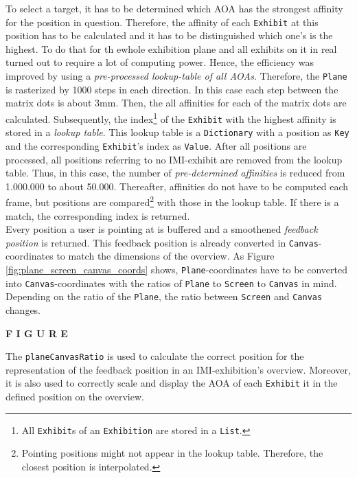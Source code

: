 To select a target, it has to be determined which \ac{AOA} has the strongest affinity for the position in question. Therefore, the affinity of each \texttt{Exhibit} at this position has to be calculated and it has to be distinguished which one's is the highest. To do that for th ewhole exhibition plane and all exhibits on it in real turned out to require a lot of computing power. Hence, the efficiency was improved by using a \textit{pre-processed lookup-table of all \ac{AOA}s}. Therefore, the \texttt{Plane} is rasterized by 1000 steps in each direction. In this case each step between the matrix dots is about 3mm. Then, the all affinities for each of the matrix dots are calculated. Subsequently, the index\footnote{All \texttt{Exhibit}s of an \texttt{Exhibition} are stored in a \texttt{List}.} of the \texttt{Exhibit} with the highest affinity is stored in a \textit{lookup table}. This lookup table is a \texttt{Dictionary} with a position as \texttt{Key} and the corresponding \texttt{Exhibit}'s index as \texttt{Value}. After all positions are processed, all positions referring to no \ac{IMI}-exhibit are removed from the lookup table. Thus, in this case, the number of \textit{pre-determined affinities} is reduced from 1.000.000 to about 50.000. Thereafter, affinities do not have to be computed each frame, but positions are compared\footnote{Pointing positions might not appear in the lookup table. Therefore, the closest position is interpolated.} with those in the lookup table. If there is a match, the corresponding index is returned.
\\
Every position a user is pointing at is buffered and a smoothened \textit{feedback position} is returned. This feedback position is already converted in \texttt{Canvas}-coordinates to match the dimensions of the overview. As Figure \ref{fig:plane_screen_canvas_coords} shows, \texttt{Plane}-coordinates have to be converted into \texttt{Canvas}-coordinates with the ratios of \texttt{Plane} to \texttt{Screen} to \texttt{Canvas} in mind. Depending on the ratio of the \texttt{Plane}, the ratio between \texttt{Screen} and \texttt{Canvas} changes.

\textbf{F I G U R E}

The \texttt{planeCanvasRatio} is used to calculate the correct position for the representation of the feedback position in an \ac{IMI}-exhibition's overview. Moreover, it is also used to correctly scale and display the \ac{AOA} of each \texttt{Exhibit} it in the defined position on the overview.

